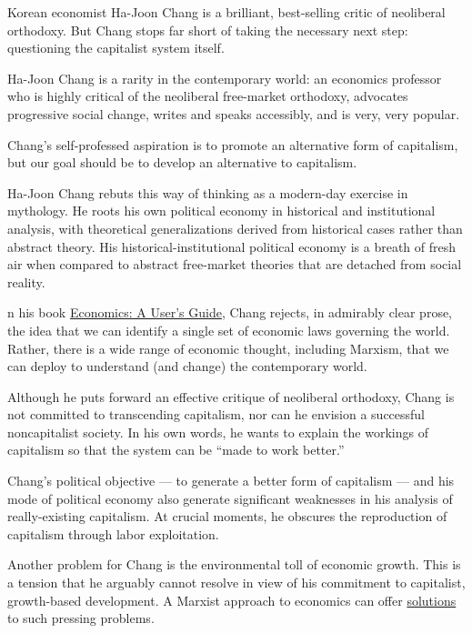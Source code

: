 \documentclass[
]{book}
\begin{document}
Korean economist Ha-Joon Chang is a brilliant, best-selling critic of neoliberal orthodoxy. But Chang stops far short of taking the necessary next step: questioning the capitalist system itself.

Ha-Joon Chang is a rarity in the contemporary world: an economics professor who is highly critical of the neoliberal free-market orthodoxy, advocates progressive social change, writes and speaks accessibly, and is very, very popular.

Chang's self-professed aspiration is to promote an alternative form of capitalism, but our goal should be to develop an alternative to capitalism.

Ha-Joon Chang rebuts this way of thinking as a modern-day exercise in mythology. He roots his own political economy in historical and institutional analysis, with theoretical generalizations derived from historical cases rather than abstract theory. His historical-institutional political economy is a breath of fresh air when compared to abstract free-market theories that are detached from social reality.

n his book \href{https://www.penguin.co.uk/books/187172/economics-the-users-guide-by-chang-ha-joon/9780718197032}{Economics: A User's Guide}, Chang rejects, in admirably clear prose, the idea that we can identify a single set of economic laws governing the world. Rather, there is a wide range of economic thought, including Marxism, that we can deploy to understand (and change) the contemporary world.

Although he puts forward an effective critique of neoliberal orthodoxy, Chang is not committed to transcending capitalism, nor can he envision a successful noncapitalist society. In his own words, he wants to explain the workings of capitalism so that the system can be ``made to work better.''

Chang's political objective --- to generate a better form of capitalism --- and his mode of political economy also generate significant weaknesses in his analysis of really-existing capitalism. At crucial moments, he obscures the reproduction of capitalism through labor exploitation.

Another problem for Chang is the environmental toll of economic growth. This is a tension that he arguably cannot resolve in view of his commitment to capitalist, growth-based development. A Marxist approach to economics can offer \href{https://jacobin.com/2017/08/within-and-against-capitalism/}{solutions} to such pressing problems.
\end{document}
